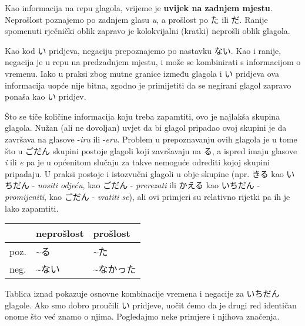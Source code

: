 	\vspace{5pt}
	Kao informacija na repu glagola, vrijeme je \textbf{uvijek na zadnjem mjestu}. Neprošlost poznajemo po zadnjem glasu \textit{u}, a prošlost po た ili だ. Ranije spomenuti rječnički oblik zapravo je kolokvijalni (kratki) neprošli oblik glagola.
	
	
	Kao kod い pridjeva, negaciju prepoznajemo po nastavku ない. Kao i ranije, negacija je u repu na predzadnjem mjestu, i može se kombinirati s informacijom o vremenu. Iako u praksi zbog mutne granice između glagola i い pridjeva ova informacija uopće nije bitna, zgodno je primijetiti da se negirani glagol zapravo ponaša kao い pridjev.
	
	\newpage
	
	Što se tiče količine informacija koju treba zapamtiti, ovo je najlakša skupina glagola. Nužan (ali ne dovoljan) uvjet da bi glagol pripadao ovoj skupini je da završava na glasove -\textit{iru} ili -\textit{eru}. Problem u prepoznavanju ovih glagola je u tome što u ごだん skupini postoje glagoli koji završavaju na る, a ispred imaju glasove \textit{i} ili \textit{e} pa je u općenitom slučaju za takve nemoguće odrediti kojoj skupini pripadaju. U praksi postoje i istozvučni glagoli u obje skupine (npr. きる kao いちだん - \textit{nositi odjeću}, kao ごだん - \textit{prerezati} ili かえる kao いちだん - \textit{promijeniti}, kao ごだん - \textit{vratiti se}), ali ovi primjeri su relativno rijetki pa ih je lako zapamtiti.
	
	\begin{table}[h]
		\centering
		\begin{tabular}{l l l}\toprule[2pt]
			& neprošlost & prošlost\\
			\midrule
			poz. & \textasciitilde る & \textasciitilde た\\
			neg. & \textasciitilde ない & \textasciitilde なかった\\
			\bottomrule[2pt]
		\end{tabular}
	\end{table}

	Tablica iznad pokazuje osnovne kombinacije vremena i negacije za いちだん glagole. Ako smo dobro proučili い pridjeve, uočit ćemo da je drugi red identičan onome što već znamo o njima. Pogledajmo neke primjere i njihova značenja.
	
	\begin{reibun}
	\end{reibun}
	

